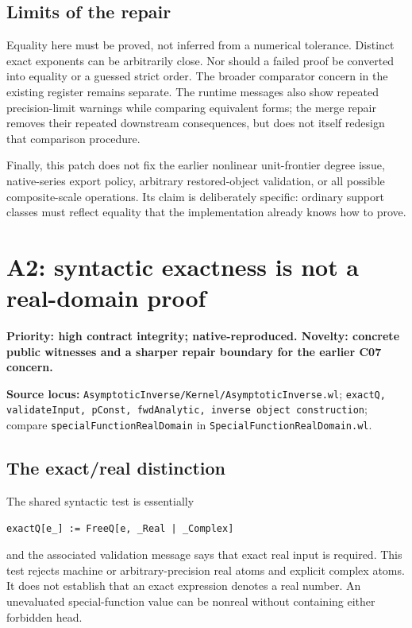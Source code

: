 \documentclass[11pt,letterpaper]{article}
\newcommand{\code}[1]{{\small\nolinkurl{#1}}}
\newcommand{\source}[2]{\textbf{Source locus:} \code{#1}; \code{#2}}
\begin{document}
\subsection{Limits of the repair}
Equality here must be proved, not inferred from a numerical tolerance. Distinct exact exponents can be arbitrarily close. Nor should a failed proof be converted into equality or a guessed strict order. The broader comparator concern in the existing register remains separate. The runtime messages also show repeated precision-limit warnings while comparing equivalent forms; the merge repair removes their repeated downstream consequences, but does not itself redesign that comparison procedure.

Finally, this patch does not fix the earlier nonlinear unit-frontier degree issue, native-series export policy, arbitrary restored-object validation, or all possible composite-scale operations. Its claim is deliberately specific: ordinary support classes must reflect equality that the implementation already knows how to prove.

\section{A2: syntactic exactness is not a real-domain proof}
\label{sec:a2}
\textbf{Priority: high contract integrity; native-reproduced. Novelty: concrete public witnesses and a sharper repair boundary for the earlier C07 concern.}

\source{AsymptoticInverse/Kernel/AsymptoticInverse.wl}{exactQ, validateInput, pConst, fwdAnalytic, inverse object construction}; compare \code{specialFunctionRealDomain} in \code{SpecialFunctionRealDomain.wl}.\cite{core,real-domain}

\subsection{The exact/real distinction}
The shared syntactic test is essentially
\begin{lstlisting}
exactQ[e_] := FreeQ[e, _Real | _Complex]
\end{lstlisting}
and the associated validation message says that exact real input is required. This test rejects machine or arbitrary-precision real atoms and explicit complex atoms. It does not establish that an exact expression denotes a real number. An unevaluated special-function value can be nonreal without containing either forbidden head.\cite{core}
\end{document}
